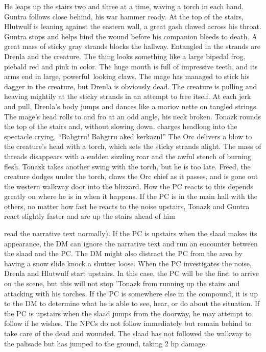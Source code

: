 \documentclass[a5paper,11pt,twoside]{book}
\begin{document}
{{{{He leaps up the stairs two and three at a time, waving a torch in each hand.
Guntra follows close behind, his war hammer ready.
At the top of the stairs, Hlutwulf is leaning against the eastern wall, a great gash clawed across his throat.
Guntra stops and helps bind the wound before his companion bleeds to death.
A great mass of sticky gray strands blocks the hallway.
Entangled in the strands are Drenla and the creature.
The thing looks something like a large bipedal frog, piebald red and pink in color.
The huge mouth is full of impressive teeth, and its arms end in large, powerful~looking claws.
The mage has managed to stick his dagger in the creature, but Drenla is obviously dead.
The creature is pulling and heaving mightily at the sticky strands in an attempt to free itself.
At each jerk and pull, Drenla’s body jumps and dances like a mariov nette on tangled strings.
The mage’s head rolls to and fro at an odd angle, his neck broken.
Tonazk rounds the top of the stairs and, without slowing down, charges headlong into the spectacle crying, “Bahgtru! Bahgtru aked kerkaznl” The Orc delivers a blow to the creature’s head with a torch, which sets the sticky strands alight.
The mass of threads disappears with a sudden sizzling roar and the awful stench of burning flesh.
Tonazk takes another swing with the torch, but he is too late.
Freed, the creature dodges under the torch, claws the Orc chief as it passes, and is gone out the western walkway door into the blizzard.
How the PC reacts to this depends greatly on where he is in when it happens.
If the PC is in the main hall with the others, no matter how fast he reacts to the noise upstairs, Tonazk and Guntra react slightly faster and are up the stairs ahead of him {read the narrative text normally).
If the PC is upstairs when the slaad makes its appearance, the DM can ignore the narrative text and run an encounter between the slaad and the PC.
The DM might also distract the PC from the area by having a snow slide knock a shutter loose.
When the PC  investigates the noise, Drenla and Hlutwulf start upstairs.
In this case, the PC will be the first to arrive on the scene, but this will not stop 'Tonazk from running up the stairs and attacking with his torches.
If the PC is somewhere else in the compound, it is up to the DM to determine what he is able to see, hear, or do about the situation.
If the PC is upstairs when the slaad jumps from the doorway, he may attempt to follow if he wishes.
The NPCs do not follow immediately but remain behind to take care of the dead and wounded.
The slaad has not followed the walkway to the palisade but has jumped to the ground, taking 2 hp damage.

}}}}}
\end{document}
